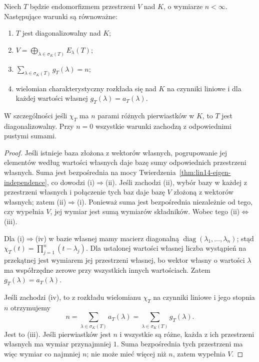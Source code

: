 \begin{twierdzenie}
\label{thm:lin14-diag-criterion}
Niech \(T\) będzie endomorfizmem
przestrzeni \(V\) nad \(K\),
o wymiarze \(n<\infty\).
Następujące warunki są równoważne:
\begin{enumerate}[label=(\roman*)]
\item \(T\) jest diagonalizowalny nad \(K\);
\item \(V=\bigoplus_{\lambda\in\sigma_K(T)}
                    E_\lambda(T)\);
\item \(\sum_{\lambda\in\sigma_K(T)}
             g_T(\lambda)=n\);
\item wielomian charakterystyczny
      rozkłada się nad \(K\) na czynniki liniowe
      i dla każdej wartości własnej
      \(g_T(\lambda)=a_T(\lambda)\).
\end{enumerate}
W szczególności jeśli \(\chi_T\)
ma \(n\) parami różnych pierwiastków w \(K\),
to \(T\) jest diagonalizowalny.
Przy \(n=0\) wszystkie warunki zachodzą
z odpowiednimi pustymi sumami.
\end{twierdzenie}
\begin{proof}
Jeśli istnieje baza złożona
z wektorów własnych, pogrupowanie
jej elementów według wartości własnych
daje bazę sumy odpowiednich
przestrzeni własnych.
Suma jest bezpośrednia na mocy
Twierdzenia~\ref{thm:lin14-eigen-independence},
co dowodzi (i)\(\Rightarrow\)(ii).
Jeśli zachodzi (ii), wybór bazy
w każdej z przestrzeni własnych
i połączenie tych baz daje
bazę \(V\) złożoną z wektorów własnych;
zatem (ii)\(\Rightarrow\)(i).
Ponieważ suma jest bezpośrednia
niezależnie od tego, czy wypełnia \(V\),
jej wymiar jest sumą
wymiarów składników.
Wobec tego (ii)\(\Leftrightarrow\)(iii).

Dla (i)\(\Rightarrow\)(iv)
w bazie własnej mamy
macierz diagonalną
\(\operatorname{diag}(\lambda_1,\ldots,\lambda_n)\);
stąd \(\chi_T(t)=\prod_{j=1}^n(t-\lambda_j)\).
Dla ustalonej wartości własnej
liczba wystąpień na przekątnej
jest wymiarem jej przestrzeni własnej,
bo wektor własny o wartości \(\lambda\)
ma współrzędne zerowe
przy wszystkich innych wartościach.
Zatem \(g_T(\lambda)=a_T(\lambda)\).

Jeśli zachodzi (iv), to z
rozkładu wielomianu
\(\chi_T\) na czynniki liniowe i jego stopnia \(n\)
otrzymujemy
\[
 n=\sum_{\lambda\in\sigma_K(T)}
                         a_T(\lambda)
  =\sum_{\lambda\in\sigma_K(T)}
                         g_T(\lambda).
\]
Jest to (iii).
Jeśli pierwiastków jest \(n\)
i wszystkie są różne,
każda z ich przestrzeni własnych
ma wymiar przynajmniej \(1\).
Suma bezpośrednia tych przestrzeni
ma więc wymiar co najmniej \(n\);
nie może mieć więcej niż \(n\),
zatem wypełnia \(V\).
\end{proof}

